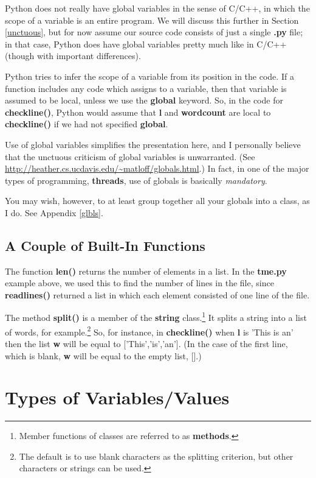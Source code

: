 Python does not really have global variables in the sense of C/C++, in
which the scope of a variable is an entire program.  We will discuss
this further in Section \ref{unctuous}, but for now assume our source
code consists of just a single {\bf .py} file; in that case, Python does
have global variables pretty much like in C/C++ (though with important
differences).

Python tries to infer the scope of a variable from its position in the
code.  If a function includes any code which assigns to a variable, then
that variable is assumed to be local, unless we use the {\bf global}
keyword.  So, in the code for {\bf checkline()}, Python would assume
that {\bf l} and {\bf wordcount} are local to {\bf checkline()} if we
had not specified {\bf global}.

Use of global variables simplifies the presentation here, and I
personally believe that the unctuous criticism of global variables is
unwarranted.  (See
\url{http://heather.cs.ucdavis.edu/~matloff/globals.html}.)  In fact, in
one of the major types of programming, {\bf threads}, use of globals is
basically {\it mandatory}.  

You may wish, however, to at least group together all your globals into
a class, as I do.  See Appendix \ref{glbls}. 

\subsection{A Couple of Built-In Functions}

The function {\bf len()} returns the number of elements in a list.  In
the {\bf tme.py} example above, we used this to find the number of lines
in the file, since {\bf readlines()} returned a list in which each
element consisted of one line of the file. 

The method {\bf split()} is a member of the {\bf string}
class.\footnote{Member functions of classes are referred to as {\bf
methods}.} It splits a string into a list of words, for
example.\footnote{The default is to use blank characters as the
splitting criterion, but other characters or strings can be used.}  So,
for instance, in {\bf checkline()} when {\bf l} is 'This is an' then the
list {\bf w} will be equal to ['This','is','an'].  (In the case of the
first line, which is blank, {\bf w} will be equal to the empty list,
[].) 

\section{Types of Variables/Values}

